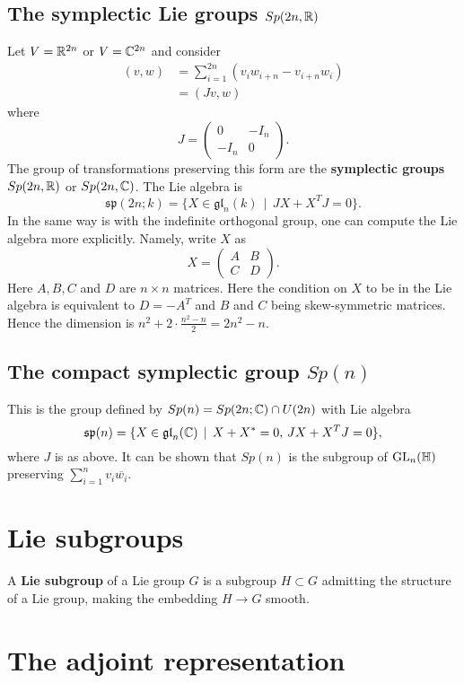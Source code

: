\documentclass[11pt, english]{article}
\begin{document}
\subsection{The symplectic Lie groups $Sp(2n,\mathbb{R})$}

Let $V= \mathbb{R}^{2n}$ or $V= \mathbb{C}^{2n}$ and consider
\begin{align*}
  (v,w) &= \sum_{i=1}^{2n} (v_i w_{i+n}-v_{i+n}w_i) \\
&= (Jv,w)
\end{align*}
where
$$
J =
\begin{pmatrix}
  0 & -I_n \\
-I_n & 0 
\end{pmatrix}.
$$
The group of transformations preserving this form are the \textbf{symplectic groups} $Sp(2n,\mathbb{R})$ or $Sp(2n,\mathbb{C})$. The Lie algebra is
$$
\mathfrak{sp}(2n;k) = \{ X \in \mathfrak{gl}_n(k) \, \mid \, JX+X^TJ = 0 \}.
$$
In the same way is with the indefinite orthogonal group, one can compute the Lie algebra more explicitly. Namely, write $X$ as 
$$
X =
\begin{pmatrix}
  A & B \\
C & D
\end{pmatrix}.
$$
Here $A,B,C$ and $D$ are $n \times n$ matrices. Here the condition on $X$ to be in the Lie algebra is equivalent to $D=-A^T$ and $B$ and $C$ being skew-symmetric matrices. Hence the dimension is $n^2+2 \cdot \frac{n^2-n}{2} = 2n^2-n$.

\subsection{The compact symplectic group $Sp(n)$} 

This is the group defined by $Sp(n) = Sp(2n; \mathbb{C}) \cap U(2n)$ with Lie algebra
$$
\mathfrak{sp}(n) = \{ X \in \mathfrak{gl}_n(\mathbb{C}) \, \mid \, X+X^*=0, \, JX+X^TJ = 0\},
$$
where $J$ is as above. It can be shown that $Sp(n)$ is the subgroup of $\operatorname{GL}_n(\mathbb H)$ preserving $\sum_{i=1}^n v_i \overline{w_i}$. 

\newpage
\section{Lie subgroups}

A \textbf{Lie subgroup} of a Lie group $G$ is a subgroup $H \subset G$ admitting the structure of a Lie group, making the embedding $H \to G$ smooth. 

\section{The adjoint representation}
\end{document}
